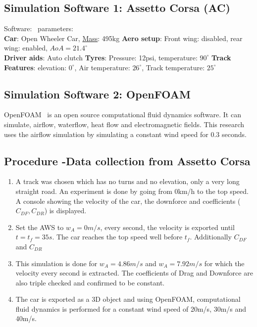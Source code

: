 \documentclass[11pt, a4paper]{article}
\begin{document}
\subsection{Simulation Software 1: Assetto Corsa (AC)}
Software:~\cite{7} parameters: \\
\textbf{Car}: Open Wheeler Car, \underline{Mass}: 495kg\newline
\textbf{Aero setup}: Front wing: disabled, rear wing: enabled, $AoA=21.4^{\circ}$\\
\textbf{Driver aids}: Auto clutch\newline
\textbf{Tyres}: Pressure: 12psi, temperature: \(90^{\circ}\)\newline
\textbf{Track Features}: elevation: \(0^{\circ}\), Air temperature: \(26^{\circ}\), Track temperature: \(25^{\circ}\)
\subsection{Simulation Software 2: OpenFOAM}
OpenFOAM~\cite{8} is an open source computational fluid dynamics software. It can simulate, airflow, waterflow, heat flow and electromagnetic fields. This research uses the airflow simulation by simulating a constant wind speed
for 0.3 seconds.

\subsection{Procedure -Data collection from Assetto Corsa}
\begin{enumerate}
    \item A track was chosen which has no turns and no elevation, only a very long straight road. An experiment is done by going from 0km/h to the top speed. A console showing the velocity of the car, the downforce and coefficients ($C_{DF}, C_{DR}$) is displayed.
    \item Set the AWS to \(w_A=0m/s\), every second, the velocity is exported until $t=t_{f}=35s$.  The car reaches the top speed well before $t_f$. Additionally $C_{DF}$ and $C_{DR}$
    \item This simulation is done for \(w_A=4.86m/s\) and \(w_A=7.92m/s\) for which the velocity every second is extracted. The coefficients of Drag and Downforce are also triple checked and confirmed to be constant. 
    \item The car is exported as a 3D object and using OpenFOAM, computational fluid dynamics is performed for a constant wind speed of 20m/s, 30m/s and 40m/s.
\end{enumerate}
\end{document}
